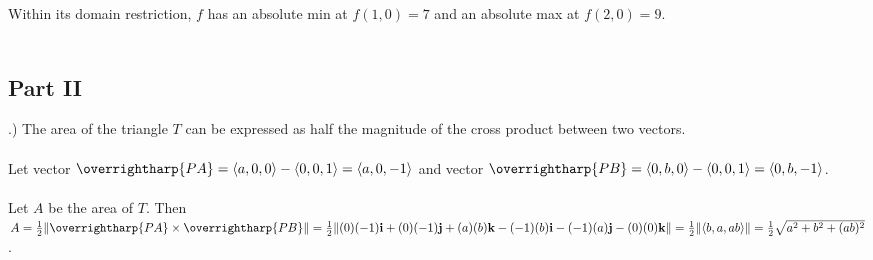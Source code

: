 \documentclass[12pt]{article}
\begin{document}
\noindent Within its domain restriction,  $f$ has an absolute min at $f(1, 0) = 7$ and an absolute max at $f(2, 0) = 9$.\\\\




\subsection*{Part II} 
.) The area of the triangle $T$ can be expressed as half the magnitude of the 
cross product between two vectors.\\\\
\noindent Let vector $\overrightharp{PA} = \langle a, 0, 0 \rangle - \langle 0, 0, 1\rangle = \langle a, 0, -1\rangle$ and vector $\overrightharp{PB} = \langle 0, b, 0 \rangle - \langle 0, 0, 1 \rangle = \langle 0, b, -1\rangle$. \\\\
\noindent Let $A$ be the area of $T$. Then $A = \frac{1}{2} \| \overrightharp{PA} \times \overrightharp{PB} \| \\\\
=\frac{1}{2}\|(0)(-1)\mathbf{i} + (0)(-1)\mathbf{j} + (a)(b)\mathbf{k} - (-1)(b)\mathbf{i} - (-1)(a)\mathbf{j} - (0)(0)\mathbf{k}\| 
\\\\=  \frac{1}{2}\| \langle b , a , ab\rangle \| 
\\\\ = \frac{1}{2}\sqrt{a^{2} + b^{2} + (ab)^{2}}$.\\\\
\end{document}
